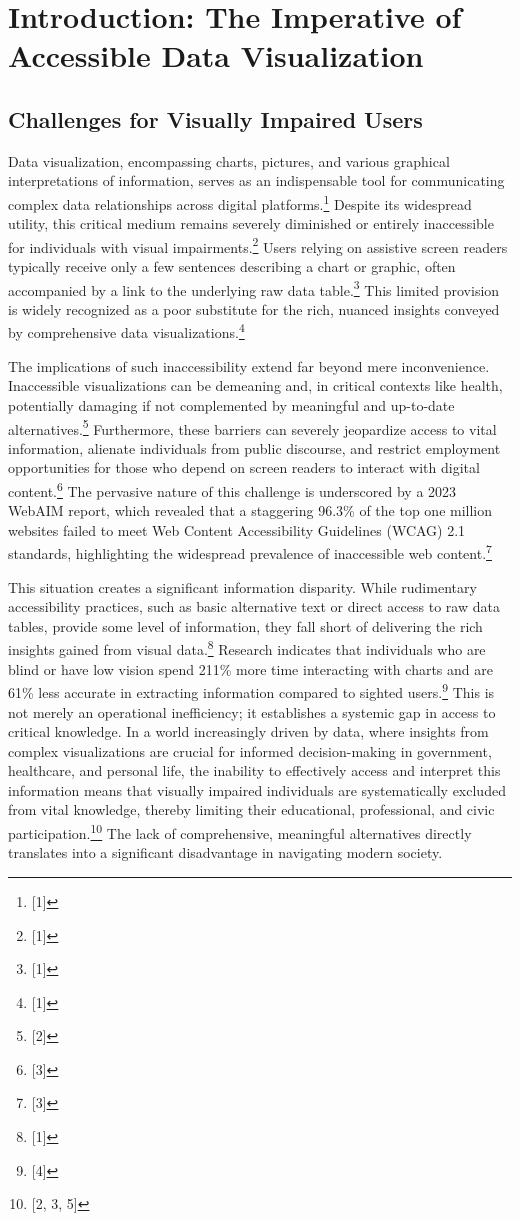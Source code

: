 \section{Introduction: The Imperative of Accessible Data Visualization}

\subsection{Challenges for Visually Impaired Users}
Data visualization, encompassing charts, pictures, and various graphical interpretations of information, serves as an indispensable tool for communicating complex data relationships across digital platforms.\footnote{[1]} Despite its widespread utility, this critical medium remains severely diminished or entirely inaccessible for individuals with visual impairments.\footnote{[1]} Users relying on assistive screen readers typically receive only a few sentences describing a chart or graphic, often accompanied by a link to the underlying raw data table.\footnote{[1]} This limited provision is widely recognized as a poor substitute for the rich, nuanced insights conveyed by comprehensive data visualizations.\footnote{[1]}

The implications of such inaccessibility extend far beyond mere inconvenience. Inaccessible visualizations can be demeaning and, in critical contexts like health, potentially damaging if not complemented by meaningful and up-to-date alternatives.\footnote{[2]} Furthermore, these barriers can severely jeopardize access to vital information, alienate individuals from public discourse, and restrict employment opportunities for those who depend on screen readers to interact with digital content.\footnote{[3]} The pervasive nature of this challenge is underscored by a 2023 WebAIM report, which revealed that a staggering 96.3\% of the top one million websites failed to meet Web Content Accessibility Guidelines (WCAG) 2.1 standards, highlighting the widespread prevalence of inaccessible web content.\footnote{[3]}

This situation creates a significant information disparity. While rudimentary accessibility practices, such as basic alternative text or direct access to raw data tables, provide some level of information, they fall short of delivering the rich insights gained from visual data.\footnote{[1]} Research indicates that individuals who are blind or have low vision spend 211\% more time interacting with charts and are 61\% less accurate in extracting information compared to sighted users.\footnote{[4]} This is not merely an operational inefficiency; it establishes a systemic gap in access to critical knowledge. In a world increasingly driven by data, where insights from complex visualizations are crucial for informed decision-making in government, healthcare, and personal life, the inability to effectively access and interpret this information means that visually impaired individuals are systematically excluded from vital knowledge, thereby limiting their educational, professional, and civic participation.\footnote{[2, 3, 5]} The lack of comprehensive, meaningful alternatives directly translates into a significant disadvantage in navigating modern society.

